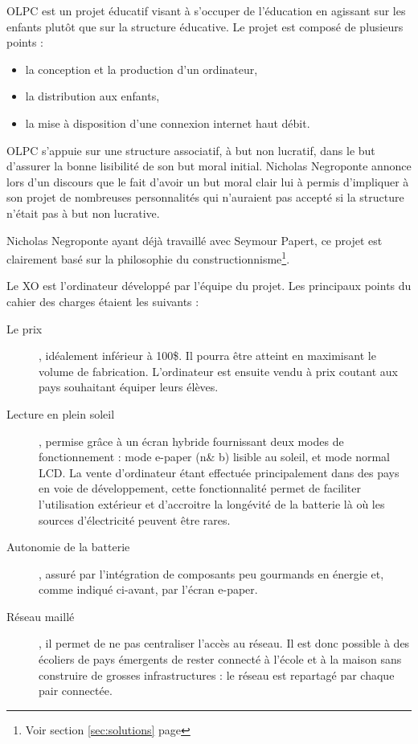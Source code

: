 OLPC est un projet éducatif visant à s'occuper de l'éducation en agissant sur les enfants plutôt que sur la structure éducative. Le projet est composé de plusieurs points : 



\begin{itemize}
  \item la conception et la production d'un ordinateur,
  \item la distribution aux enfants,
  \item la mise à disposition d'une connexion internet haut débit.
\end{itemize}

OLPC s'appuie sur une structure associatif, à but non lucratif, dans le but d'assurer la bonne lisibilité de son but moral initial. Nicholas Negroponte annonce lors d'un discours \cite{ted_olpc_2008} que le fait d'avoir un but moral clair lui à permis d'impliquer à son projet de nombreuses personnalités qui n'auraient pas accepté si la structure n'était pas à but non lucrative.

Nicholas Negroponte ayant déjà travaillé avec Seymour Papert, ce projet est clairement basé sur la philosophie du constructionnisme\footnote{Voir section \ref{sec:solutions} page \pageref{sec:solutions}}.

Le XO est l'ordinateur développé par l'équipe du projet. Les principaux points du cahier des charges étaient les suivants : 

\begin{description}
  \item [Le prix], idéalement inférieur à 100\$. Il pourra être atteint en maximisant le volume de fabrication. L'ordinateur est ensuite vendu à prix coutant aux pays souhaitant équiper leurs élèves.
  \item [Lecture en plein soleil], permise grâce à un écran hybride fournissant deux modes de fonctionnement : mode e-paper (n\& b) lisible au soleil, et mode normal LCD. La vente d'ordinateur étant effectuée principalement dans des pays en voie de développement, cette fonctionnalité permet de faciliter l'utilisation extérieur et d'accroitre la longévité de la batterie là où les sources d'électricité peuvent être rares.
  \item [Autonomie de la batterie], assuré par l'intégration de composants peu gourmands en énergie et, comme indiqué ci-avant, par l'écran e-paper.
  \item [Réseau maillé], il permet de ne pas centraliser l'accès au réseau. Il est donc possible à des écoliers de pays émergents de rester connecté à l'école et à la maison sans construire de grosses infrastructures : le réseau est repartagé par chaque pair connectée.
\end{description}

